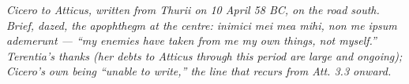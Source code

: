 
\textit{Cicero to Atticus, written from Thurii on 10 April 58
BC, on the road south. Brief, dazed, the apophthegm at the
centre: \textit{inimici mei mea mihi, non me ipsum ademerunt}
--- ``my enemies have taken from me my own things, not
myself.'' Terentia's thanks (her debts to Atticus through
this period are large and ongoing); Cicero's own being
``unable to write,'' the line that recurs from \textit{Att.}
3.3 onward.}

